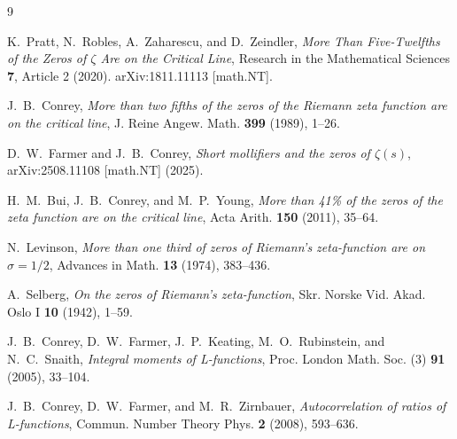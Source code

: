 \documentclass[11pt]{article}
\begin{document}
\begin{thebibliography}{9}

K.~Pratt, N.~Robles, A.~Zaharescu, and D.~Zeindler,
\textit{More Than Five-Twelfths of the Zeros of $\zeta$ Are on the Critical Line},
Research in the Mathematical Sciences \textbf{7}, Article 2 (2020).
arXiv:1811.11113 [math.NT].

J.~B.~Conrey,
\textit{More than two fifths of the zeros of the Riemann zeta function are on the critical line},
J. Reine Angew. Math. \textbf{399} (1989), 1--26.

D.~W.~Farmer and J.~B.~Conrey,
\textit{Short mollifiers and the zeros of $\zeta(s)$},
arXiv:2508.11108 [math.NT] (2025).

H.~M.~Bui, J.~B.~Conrey, and M.~P.~Young,
\textit{More than 41\% of the zeros of the zeta function are on the critical line},
Acta Arith. \textbf{150} (2011), 35--64.

N.~Levinson,
\textit{More than one third of zeros of Riemann's zeta-function are on $\sigma = 1/2$},
Advances in Math. \textbf{13} (1974), 383--436.

A.~Selberg,
\textit{On the zeros of Riemann's zeta-function},
Skr. Norske Vid. Akad. Oslo I \textbf{10} (1942), 1--59.

J.~B.~Conrey, D.~W.~Farmer, J.~P.~Keating, M.~O.~Rubinstein, and N.~C.~Snaith,
\textit{Integral moments of L-functions},
Proc. London Math. Soc. (3) \textbf{91} (2005), 33--104.

J.~B.~Conrey, D.~W.~Farmer, and M.~R.~Zirnbauer,
\textit{Autocorrelation of ratios of L-functions},
Commun. Number Theory Phys. \textbf{2} (2008), 593--636.

\end{thebibliography}
\end{document}
